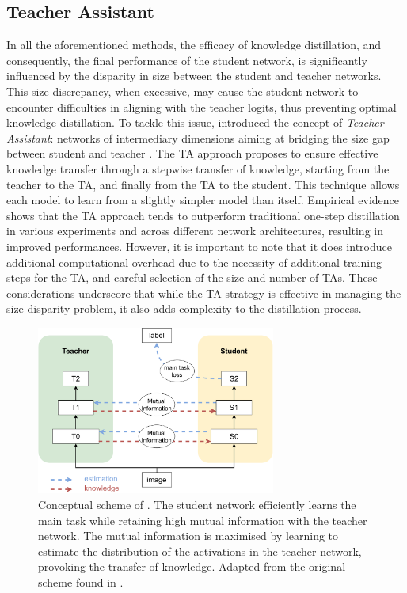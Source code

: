 \subsection{Teacher Assistant}
In all the aforementioned methods, the efficacy of knowledge distillation, and
consequently, the final performance of the student network, is significantly
influenced by the disparity in size between the student and teacher networks.
This size discrepancy, when excessive, may cause the student network to
encounter difficulties in aligning with the teacher logits, thus preventing
optimal knowledge distillation. To tackle this issue,
\citeauthor{DBLP:conf/aaai/MirzadehFLLMG20} introduced the concept of
\emph{Teacher Assistant}: networks of intermediary dimensions aiming at bridging
the size gap between student and teacher \cite{DBLP:conf/aaai/MirzadehFLLMG20}.
The \ac{TA} approach proposes to ensure effective knowledge transfer through a
stepwise transfer of knowledge, starting from the teacher to the \ac{TA}, and
finally from the \ac{TA} to the student. This technique allows each model to
learn from a slightly simpler model than itself. Empirical evidence shows that
the \ac{TA} approach tends to outperform traditional one-step distillation in
various experiments and across different network architectures, resulting in
improved performances. However, it is important to note that it does introduce
additional computational overhead due to the necessity of additional training
steps for the \ac{TA}, and careful selection of the size and number of \acp{TA}.
These considerations underscore that while the \ac{TA} strategy is effective in
managing the size disparity problem, it also adds complexity to the distillation
process.\\


\begin{figure}[htbp]
  \centering
  \includegraphics[width=0.7\textwidth]{chapter_sota/assets/variational_info_distillation.pdf}
  \caption{Conceptual scheme of \cite{DBLP:conf/cvpr/AhnHDLD19}. The student
    network efficiently learns the main task while retaining high mutual
    information with the teacher network. The mutual information is
    maximised by learning to estimate the distribution of the activations in
    the teacher network, provoking the transfer of knowledge. Adapted from
    the original scheme found in \cite{DBLP:conf/cvpr/AhnHDLD19}.}
  \label{fig:sota:vid_scheme}
\end{figure}

